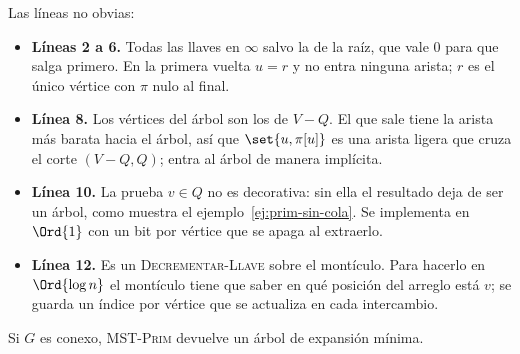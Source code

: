 \documentclass[11pt,letterpaper]{article}
\begin{document}
Las líneas no obvias:
\begin{itemize}[itemsep=0.1em]
  \item \textbf{Líneas 2 a 6.} Todas las llaves en $\infty$ salvo la de
        la raíz, que vale $0$ para que salga primero. En la primera
        vuelta $u = r$ y no entra ninguna arista; $r$ es el único
        vértice con $\pi$ nulo al final.
  \item \textbf{Línea 8.} Los vértices del árbol son los de $V - Q$.
        El que sale tiene la arista más barata hacia el árbol, así que
        $\set{u, \pi[u]}$ es una arista ligera que cruza el corte
        $(V - Q, Q)$; entra al árbol de manera implícita.
  \item \textbf{Línea 10.} La prueba $v \in Q$ no es decorativa: sin
        ella el resultado deja de ser un árbol, como muestra el
        ejemplo~\ref{ej:prim-sin-cola}. Se implementa en $\Ord{1}$ con
        un bit por vértice que se apaga al extraerlo.
  \item \textbf{Línea 12.} Es un \textsc{Decrementar-Llave} sobre el
        montículo. Para hacerlo en $\Ord{\log n}$ el montículo tiene
        que saber en qué posición del arreglo está $v$; se guarda un
        índice por vértice que se actualiza en cada intercambio.
\end{itemize}

\begin{proposicion}
  \label{prop:prim-mst}
  Si $G$ es conexo, \textsc{MST-Prim} devuelve un árbol de expansión
  mínima.
\end{proposicion}
\end{document}
